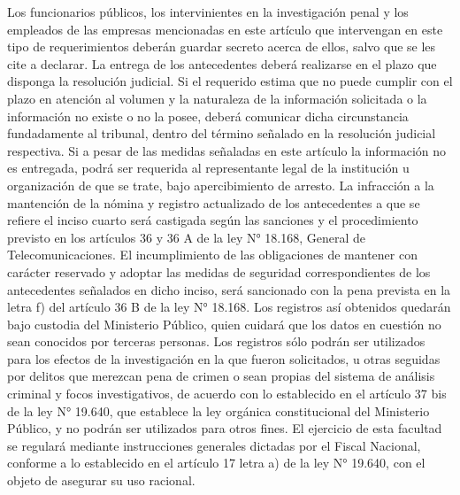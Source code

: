     Los funcionarios públicos, los intervinientes en la investigación penal y los empleados de las empresas mencionadas en este artículo que intervengan en este tipo de requerimientos deberán guardar secreto acerca de ellos, salvo que se les cite a declarar.
    La entrega de los antecedentes deberá realizarse en el plazo que disponga la resolución judicial. Si el requerido estima que no puede cumplir con el plazo en atención al volumen y la naturaleza de la información solicitada o la información no existe o no la posee, deberá comunicar dicha circunstancia fundadamente al tribunal, dentro del término señalado en la resolución judicial respectiva.
    Si a pesar de las medidas señaladas en este artículo la información no es entregada, podrá ser requerida al representante legal de la institución u organización de que se trate, bajo apercibimiento de arresto.
    La infracción a la mantención de la nómina y registro actualizado de los antecedentes a que se refiere el inciso cuarto será castigada según las sanciones y el procedimiento previsto en los artículos 36 y 36 A de la ley N° 18.168, General de Telecomunicaciones. El incumplimiento de las obligaciones de mantener con carácter reservado y adoptar las medidas de seguridad correspondientes de los antecedentes señalados en dicho inciso, será sancionado con la pena prevista en la letra f) del artículo 36 B de la ley N° 18.168. Los registros así obtenidos quedarán bajo custodia del Ministerio Público, quien cuidará que los datos en cuestión no sean conocidos por terceras personas.
    Los registros sólo podrán ser utilizados para los efectos de la investigación en la que fueron solicitados, u otras seguidas por delitos que merezcan pena de crimen o sean propias del sistema de análisis criminal y focos investigativos, de acuerdo con lo establecido en el artículo 37 bis de la ley N° 19.640, que establece la ley orgánica constitucional del Ministerio Público, y no podrán ser utilizados para otros fines.
    El ejercicio de esta facultad se regulará mediante instrucciones generales dictadas por el Fiscal Nacional, conforme a lo establecido en el artículo 17 letra a) de la ley N° 19.640, con el objeto de asegurar su uso racional.


